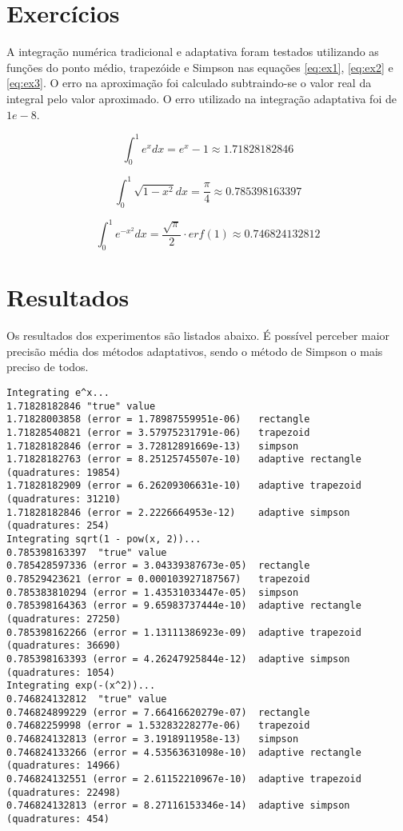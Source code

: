 
\chapter{Exercícios}

A integração numérica tradicional e adaptativa foram testados utilizando as funções do ponto médio, trapezóide e Simpson nas equações \eqref{eq:ex1}, \eqref{eq:ex2} e \eqref{eq:ex3}. O erro na aproximação foi calculado subtraindo-se o valor real da integral pelo valor aproximado. O erro utilizado na integração adaptativa foi de \(1e-8\).

\begin{equation}\label{eq:ex1}
  \int_0^1 e^xdx = e^x - 1 \approx 1.71828182846
\end{equation}

\begin{equation}\label{eq:ex2}
  \int_0^1 \sqrt{1-x^2}dx = \frac{\pi}{4} \approx 0.785398163397
\end{equation}

\begin{equation}\label{eq:ex3}
  \int_0^1 e^{-x^2}dx = \frac{\sqrt{\pi}}{2} \cdot erf(1) \approx 0.746824132812
\end{equation}

\chapter{Resultados}

Os resultados dos experimentos são listados abaixo. É possível perceber maior precisão média dos métodos adaptativos, sendo o método de Simpson o mais preciso de todos.

\begin{verbatim}
Integrating e^x...
1.71828182846 "true" value
1.71828003858 (error = 1.78987559951e-06)   rectangle
1.71828540821 (error = 3.57975231791e-06)   trapezoid
1.71828182846 (error = 3.72812891669e-13)   simpson
1.71828182763 (error = 8.25125745507e-10)   adaptive rectangle (quadratures: 19854)
1.71828182909 (error = 6.26209306631e-10)   adaptive trapezoid (quadratures: 31210)
1.71828182846 (error = 2.2226664953e-12)    adaptive simpson   (quadratures: 254)
Integrating sqrt(1 - pow(x, 2))...
0.785398163397  "true" value
0.785428597336 (error = 3.04339387673e-05)  rectangle
0.78529423621 (error = 0.000103927187567)   trapezoid
0.785383810294 (error = 1.43531033447e-05)  simpson
0.785398164363 (error = 9.65983737444e-10)  adaptive rectangle (quadratures: 27250)
0.785398162266 (error = 1.13111386923e-09)  adaptive trapezoid (quadratures: 36690)
0.785398163393 (error = 4.26247925844e-12)  adaptive simpson   (quadratures: 1054)
Integrating exp(-(x^2))...
0.746824132812  "true" value
0.746824899229 (error = 7.66416620279e-07)  rectangle
0.74682259998 (error = 1.53283228277e-06)   trapezoid
0.746824132813 (error = 3.1918911958e-13)   simpson
0.746824133266 (error = 4.53563631098e-10)  adaptive rectangle (quadratures: 14966)
0.746824132551 (error = 2.61152210967e-10)  adaptive trapezoid (quadratures: 22498)
0.746824132813 (error = 8.27116153346e-14)  adaptive simpson   (quadratures: 454)
\end{verbatim}

